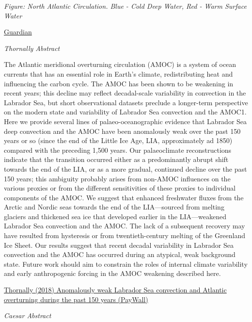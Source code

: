 \documentclass[
]{book}
\begin{document}
\emph{Figure: North Atlantic Circulation. Blue - Cold Deep Water, Red - Warm Surface Water}

\href{https://www.theguardian.com/environment/2021/aug/05/climate-crisis-scientists-spot-warning-signs-of-gulf-stream-collapse}{Guardian}

\emph{Thornally Abstract}

The Atlantic meridional overturning circulation (AMOC) is a system of ocean currents that has an essential role in Earth's climate, redistributing heat and influencing the carbon cycle. The AMOC has been shown to be weakening in recent years; this decline may reflect decadal-scale variability in convection in the Labrador Sea, but short observational datasets preclude a longer-term perspective on the modern state and variability of Labrador Sea convection and the AMOC1. Here we provide several lines of palaeo-oceanographic evidence that Labrador Sea deep convection and the AMOC have been anomalously weak over the past 150 years or so (since the end of the Little Ice Age, LIA, approximately ad 1850) compared with the preceding 1,500 years. Our palaeoclimate reconstructions indicate that the transition occurred either as a predominantly abrupt shift towards the end of the LIA, or as a more gradual, continued decline over the past 150 years; this ambiguity probably arises from non-AMOC influences on the various proxies or from the different sensitivities of these proxies to individual components of the AMOC. We suggest that enhanced freshwater fluxes from the Arctic and Nordic seas towards the end of the LIA---sourced from melting glaciers and thickened sea ice that developed earlier in the LIA---weakened Labrador Sea convection and the AMOC. The lack of a subsequent recovery may have resulted from hysteresis or from twentieth-century melting of the Greenland Ice Sheet. Our results suggest that recent decadal variability in Labrador Sea convection and the AMOC has occurred during an atypical, weak background state. Future work should aim to constrain the roles of internal climate variability and early anthropogenic forcing in the AMOC weakening described here.

\href{https://www.nature.com/articles/s41586-018-0007-4}{Thornally (2018) Anomalously weak Labrador Sea convection and Atlantic overturning during the past 150 years (PayWall)}

\emph{Caesar Abstract}
\end{document}
